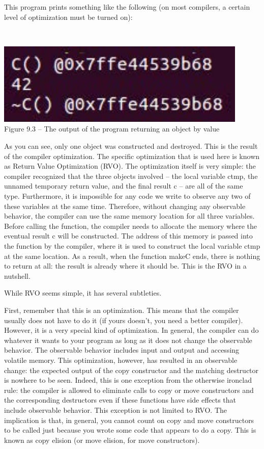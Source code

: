 This program prints something like the following (on most compilers, a certain level of optimization must be turned on):

\hspace*{\fill} \\ %
\begin{center}
\includegraphics[width=0.9\textwidth]{content/3/chapter9/images/3.jpg}\\
Figure 9.3 – The output of the program returning an object by value
\end{center}

As you can see, only one object was constructed and destroyed. This is the result of the compiler optimization. The specific optimization that is used here is known as Return Value Optimization (RVO). The optimization itself is very simple: the compiler recognized that the three objects involved – the local variable ctmp, the unnamed temporary return value, and the final result c – are all of the same type. Furthermore, it is impossible for any code we write to observe any two of these variables at the same time. Therefore, without changing any observable behavior, the compiler can use the same memory location for all three variables. Before calling the function, the compiler needs to allocate the memory where the eventual result c will be constructed. The address of this memory is passed into the function by the compiler, where it is used to construct the local variable ctmp at the same location. As a result, when the function makeC ends, there is nothing to return at all: the result is already where it should be. This is the RVO in a nutshell.

While RVO seems simple, it has several subtleties. 

First, remember that this is an optimization. This means that the compiler usually does not have to do it (if yours doesn’t, you need a better compiler). However, it is a very special kind of optimization. In general, the compiler can do whatever it wants to your program as long as it does not change the observable behavior. The observable behavior includes input and output and accessing volatile memory. This optimization, however, has resulted in an observable change: the expected output of the copy constructor and the matching destructor is nowhere to be seen. Indeed, this is one exception from the otherwise ironclad rule: the compiler is allowed to eliminate calls to copy or move constructors and the corresponding destructors even if these functions have side effects that include observable behavior. This exception is not limited to RVO. The implication is that, in general, you cannot count on copy and move constructors to be called just because you wrote some code that appears to do a copy. This is known as copy elision (or move elision, for move constructors).


